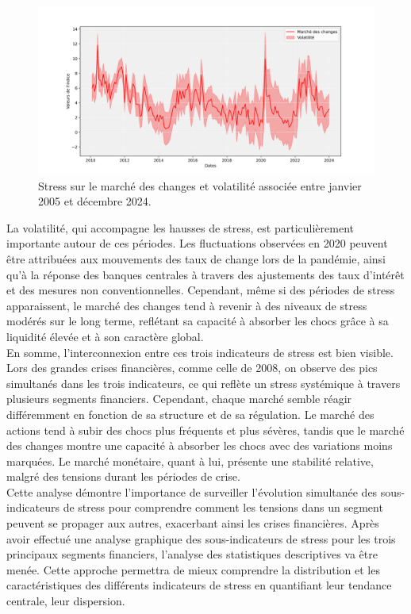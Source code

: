 \begin{figure}[H]
    \centering
    \includegraphics[width=1\linewidth]{images/sous_indicateurs_forex_stress_forex.png}
    \caption{Stress sur le marché des changes et volatilité associée entre janvier 2005 et décembre 2024.}
    \label{fig:enter-label}
\end{figure}

La volatilité, qui accompagne les hausses de stress, est particulièrement importante autour de ces périodes. Les fluctuations observées en 2020 peuvent être attribuées aux mouvements des taux de change lors de la pandémie, ainsi qu'à la réponse des banques centrales à travers des ajustements des taux d'intérêt et des mesures non conventionnelles. Cependant, même si des périodes de stress apparaissent, le marché des changes tend à revenir à des niveaux de stress modérés sur le long terme, reflétant sa capacité à absorber les chocs grâce à sa liquidité élevée et à son caractère global.\\

En somme, l'interconnexion entre ces trois indicateurs de stress est bien visible. Lors des grandes crises financières, comme celle de 2008, on observe des pics simultanés dans les trois indicateurs, ce qui reflète un stress systémique à travers plusieurs segments financiers. Cependant, chaque marché semble réagir différemment en fonction de sa structure et de sa régulation. Le marché des actions tend à subir des chocs plus fréquents et plus sévères, tandis que le marché des changes montre une capacité à absorber les chocs avec des variations moins marquées. Le marché monétaire, quant à lui, présente une stabilité relative, malgré des tensions durant les périodes de crise.\\

Cette analyse démontre l'importance de surveiller l'évolution simultanée des sous-indicateurs de stress pour comprendre comment les tensions dans un segment peuvent se propager aux autres, exacerbant ainsi les crises financières. Après avoir effectué une analyse graphique des sous-indicateurs de stress pour les trois principaux segments financiers, l'analyse des statistiques descriptives va être menée. Cette approche permettra de mieux comprendre la distribution et les caractéristiques des différents indicateurs de stress en quantifiant leur tendance centrale, leur dispersion.

